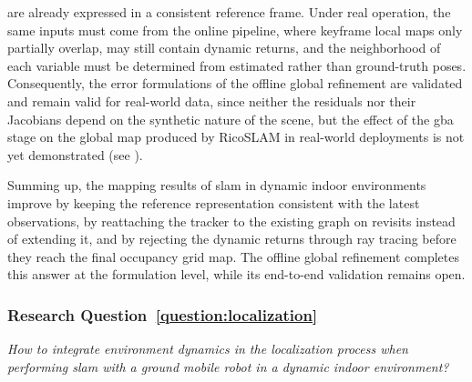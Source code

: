 \begin{itemize}
are already expressed in a consistent reference frame.
Under real operation, the same inputs must come from the online pipeline,
where keyframe local maps only partially overlap, may still contain dynamic
returns, and the neighborhood of each variable must be determined from
estimated rather than ground-truth poses.
Consequently, the error formulations of the offline global refinement are
validated and remain valid for real-world data, since neither the residuals
nor their Jacobians depend on the synthetic nature of the scene, but the
effect of the \gls{gba} stage on the global map produced by RicoSLAM in
real-world deployments is not yet demonstrated
(see ).
\end{itemize}

Summing up, the mapping results of \gls{slam} in dynamic indoor environments
improve by keeping the reference representation consistent with the latest
observations, by reattaching the tracker to the existing graph on revisits
instead of extending it, and by rejecting the dynamic returns through ray
tracing before they reach the final occupancy grid map. The offline global
refinement completes this answer at the formulation level, while its
end-to-end validation remains open.

\subsubsection{Research Question~\ref{question:localization}}

\emph{How to integrate environment dynamics in the localization process when
performing \gls{slam} with a ground mobile robot in a dynamic indoor
environment?}

